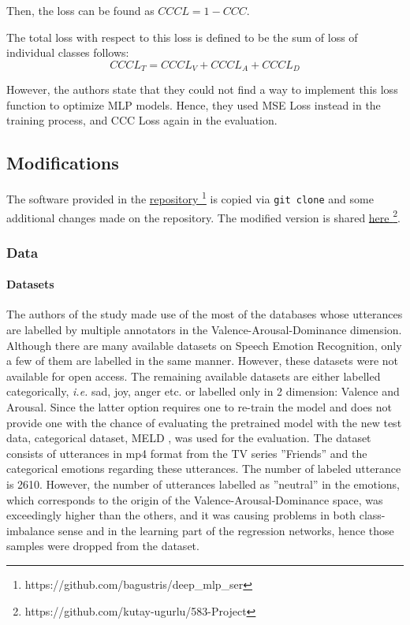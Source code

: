 \documentclass[a4paper,11pt]{article}
\begin{document}
Then, the loss can be found as $CCCL = 1 - CCC$.

The total loss with respect to this loss is defined to be the sum of loss of individual classes follows:
\begin{equation}
    CCCL_T = CCCL_V + CCCL_A + CCCL_D
    \label{eq:CCCLoss}
\end{equation}

However, the authors state that they could not find a way to implement this loss function to optimize MLP models. Hence, they used MSE Loss instead in the training process, and CCC Loss again in the evaluation. 

\pagebreak

\subsection{Modifications}

The software provided in the \href{https://github.com/bagustris/deep_mlp_ser}{repository \faExternalLink*} \footnote{https://github.com/bagustris/deep\_mlp\_ser} is copied via \texttt{git clone} and some additional changes made on the repository. The modified version is shared \href{https://github.com/kutay-ugurlu/583-Project}{here \faExternalLink*}\footnote{ https://github.com/kutay-ugurlu/583-Project}.

\subsubsection{Data}\label{subsec:MELDdata}

\paragraph{Datasets}

The authors of the study made use of the most of the databases whose utterances are labelled by multiple annotators in the Valence-Arousal-Dominance dimension. 
Although there are many available datasets on Speech Emotion Recognition, only a few of them are labelled in the same manner. However, these datasets were not available for open access. The remaining available datasets are either labelled categorically, \textit{i.e.} sad, joy, anger etc. or labelled only in 2 dimension: Valence and Arousal. Since the latter option requires one to re-train the model and does not provide one with the chance of evaluating the pretrained model with the new test data, categorical dataset, MELD \cite{atmaja2020deep}, was used for the evaluation. The dataset consists of utterances in mp4 format from the TV series ''Friends'' and the categorical emotions regarding these utterances. The number of labeled utterance is 2610. However, the number of utterances labelled as ''neutral'' in the emotions, which corresponds to the origin of the Valence-Arousal-Dominance space, was exceedingly higher than the others, and it was causing problems in both class-imbalance sense and in the learning part of the regression networks, hence those samples were dropped from the dataset.
\end{document}
